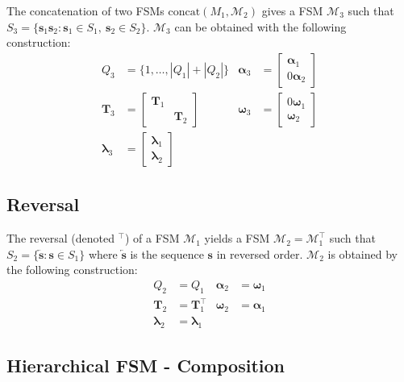 The concatenation of two FSMs $\text{concat}({M}_1, \mathcal{M}_2)$
gives a FSM $\mathcal{M}_3$ such that $S_3 = \{ \mathbf{s}_1 \mathbf{s}_2 :
\mathbf{s}_1 \in S_1, \ \mathbf{s}_2 \in S_2 \}$. $\mathcal{M}_3$
can be obtained with the following construction:
\begin{align}
    Q_3 &= \{1, \dots, |Q_1| + |Q_2| \} &
    \boldsymbol{\alpha}_3 &= \begin{bmatrix}
        \boldsymbol{\alpha}_1 \\
        0 \boldsymbol{\alpha}_2
    \end{bmatrix} \\
    \mathbf{T}_3 &= \begin{bmatrix}
        \mathbf{T}_1 & \\
        & \mathbf{T}_2
    \end{bmatrix} &
    \boldsymbol{\omega}_3 &= \begin{bmatrix}
        0 \boldsymbol{\omega}_1 \\
        \boldsymbol{\omega}_2
    \end{bmatrix} \\
    \boldsymbol{\lambda}_3 &= \begin{bmatrix}
        \boldsymbol{\lambda}_1 \\
        \boldsymbol{\lambda}_2
    \end{bmatrix} & &
\end{align}

\subsection{Reversal}

The reversal (denoted $^\top$) of a FSM $\mathcal{M}_1$ yields a FSM
$\mathcal{M}_2 = \mathcal{M}_1^\top$ such that $S_2 = \{ \overleftarrow{\mathbf{s}} :
\mathbf{s} \in S_1 \}$ where $\overleftarrow{\mathbf{s}}$ is the sequence
$\mathbf{s}$ in reversed order. $\mathcal{M}_2$ is obtained by the
following construction:
\begin{align}
    Q_2 &= Q_1 &
    \boldsymbol{\alpha}_2 &= \boldsymbol{\omega}_1 \\
    \mathbf{T}_2 &= \mathbf{T}_1^\top &
    \boldsymbol{\omega}_2 &= \boldsymbol{\alpha}_1 \\
        \boldsymbol{\lambda}_2 &= \boldsymbol{\lambda}_1 & &
\end{align}

\subsection{Hierarchical FSM - Composition}

